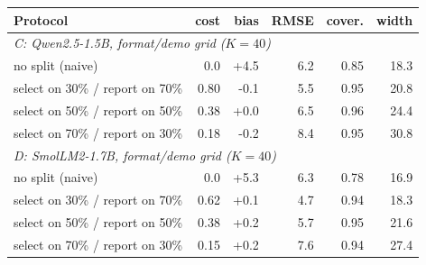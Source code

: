 \begin{tabular}{lrrrrr}\toprule
Protocol & cost & bias & RMSE & cover. & width \\\midrule
\multicolumn{6}{l}{\emph{C: Qwen2.5-1.5B, format/demo grid ($K{=}40$)}} \\
no split (naive) & 0.0 & +4.5 & 6.2 & 0.85 & 18.3 \\
select on 30\% / report on 70\% & 0.80 & -0.1 & 5.5 & 0.95 & 20.8 \\
select on 50\% / report on 50\% & 0.38 & +0.0 & 6.5 & 0.96 & 24.4 \\
select on 70\% / report on 30\% & 0.18 & -0.2 & 8.4 & 0.95 & 30.8 \\
\multicolumn{6}{l}{\emph{D: SmolLM2-1.7B, format/demo grid ($K{=}40$)}} \\
no split (naive) & 0.0 & +5.3 & 6.3 & 0.78 & 16.9 \\
select on 30\% / report on 70\% & 0.62 & +0.1 & 4.7 & 0.94 & 18.3 \\
select on 50\% / report on 50\% & 0.38 & +0.2 & 5.7 & 0.95 & 21.6 \\
select on 70\% / report on 30\% & 0.15 & +0.2 & 7.6 & 0.94 & 27.4 \\
\bottomrule
\end{tabular}
